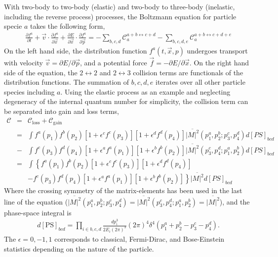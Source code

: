With two-body to two-body (elastic) and two-body to three-body (inelastic, including the reverse process) processes, the Boltzmann equation for particle specie $a$ takes the following form,
\begin{eqnarray}
\frac{\partial f^a}{\partial t} + \vec{v}\cdot\frac{\partial f^a}{\partial \vec{x}} + \frac{\partial E}{\partial \vec{x}}\cdot\frac{\partial f^{a}}{\partial \vec{p}} = - \sum_{b,c,d}\mathcal{C}_a^{a+b\leftrightarrow c+d}- \sum_{b,c,d,e}\mathcal{C}_a^{a+b\leftrightarrow c+d+e}
\end{eqnarray}
On the left hand side, the distribution function $f^{a}(t, \vec{x}, p)$ undergoes transport with velocity $\vec{v} = \partial E/\partial \vec{p}$, and a potential force $\vec{f} = -\partial E/\partial \vec{x}$.
On the right hand side of the equation, the $2\leftrightarrow 2$ and $2\leftrightarrow 3$ collision terms are functionals of the distribution functions.
The summation of $b,c,d,e$ iterates over all other particle species including $a$.
Using the elastic process as an example and neglecting degeneracy of the internal quantum number for simplicity, the collision term can be separated into gain and loss terms,
\begin{eqnarray}
\mathcal{C} &=& \mathcal{C}_\textrm{loss} + \mathcal{C}_\textrm{gain}\\
&=& \int f^a(p_1)f^b(p_2)[1+\epsilon^c f^c(p_3)][1+\epsilon^d f^d(p_4)] \overline{|M|^2}(p_1^a, p_2^b; p_3^c, p_4^d) d[PS]_{bcd} \\\nonumber
&-& \int f^c(p_3)f^d(p_4)[1+\epsilon^a f^a(p_1)][1+\epsilon^b f^b(p_2)] \overline{|M|^2}(p_3^c, p_4^d; p_1^a, p_2^b) d[PS]_{bcd} \\
&=& \int \left\{
f^a(p_1)f^b(p_2)[1+\epsilon^c f^c(p_3)][1+\epsilon^d f^d(p_4)] \right. \label{eq:collision-term:symmetry} \\\nonumber
&& \left.- f^c(p_3)f^d(p_4)[1+\epsilon^a f^a(p_1)][1+\epsilon^b f^b(p_2)]\right\}
\overline{|M|^2} d[PS]_{bcd} 
\end{eqnarray}
Where the crossing symmetry of the matrix-elements has been used in the last line of the equation ($\overline{|M|^2}(p_1^a, p_2^b; p_3^c, p_4^d) = \overline{|M|^2}(p_3^c, p_4^d; p_1^a, p_2^b) = \overline{|M|^2}$), and the phase-space integral is 
\begin{eqnarray}
d[\textrm{PS}]_{bcd} = \prod_{i\in {b,c,d}}\frac{dp_i^3}{2E_i (2\pi)^3} (2\pi)^4 \delta^{4}(p^a_1+p^b_2 - p^c_3-p^d_4).
\end{eqnarray}
The $\epsilon = 0, -1, 1$ corresponds to classical, Fermi-Dirac, and Bose-Einstein statistics depending on the nature of the particle.
